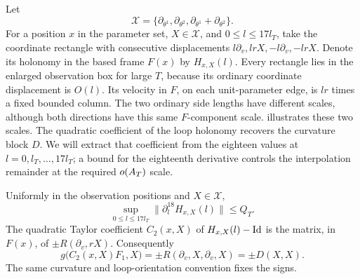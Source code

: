 Let
\begin{equation}\label{ho:directions}
 \mathcal X=\{\partial_{\theta^1},\partial_{\theta^2},
                   \partial_{\theta^1}+\partial_{\theta^2}\}.
\end{equation}
For a position $x$ in the parameter set, $X\in\mathcal X$, and
$0\le l\le17l_T$, take the coordinate rectangle with consecutive
displacements $l\partial_v,lrX,-l\partial_v,-lrX$.
Denote its holonomy in the based frame $F(x)$ by $H_{x,X}(l)$.
Every rectangle lies in the enlarged observation box for large $T$,
because its ordinary coordinate displacement is $O(l)$.
Its velocity in $F$, on each unit-parameter edge, is $lr$ times a fixed
bounded column.  The two ordinary side lengths have different scales,
although both directions have this same $F$-component scale.
 illustrates these two scales.
The quadratic coefficient of the loop holonomy recovers the curvature
block $D$. We will extract that coefficient from the eighteen values
at $l=0,l_T,\ldots,17l_T$; a bound for the eighteenth derivative
controls the interpolation remainder at the required $o(A_T)$ scale.


\begin{lemma}\label{ho:loop-jets}
Uniformly in the observation positions and $X\in\mathcal X$,
\begin{equation}\label{ho:jet-bound}
 \sup_{0\le l\le17l_T}\|\partial_l^{18}H_{x,X}(l)\|\le Q_T.
\end{equation}
The quadratic Taylor coefficient $C_2(x,X)$ of $H_{x,X}(l)-\mathrm{Id}$ is
the matrix, in $F(x)$, of $\pm R(\partial_v,rX)$.  Consequently
\begin{equation}\label{ho:curvature-cancellation}
 g\bigl(C_2(x,X)F_1,X\bigr)
       =\pm R(\partial_v,X,\partial_v,X)=\pm D(X,X).
\end{equation}
The same curvature and loop-orientation convention fixes the signs.
\end{lemma}

